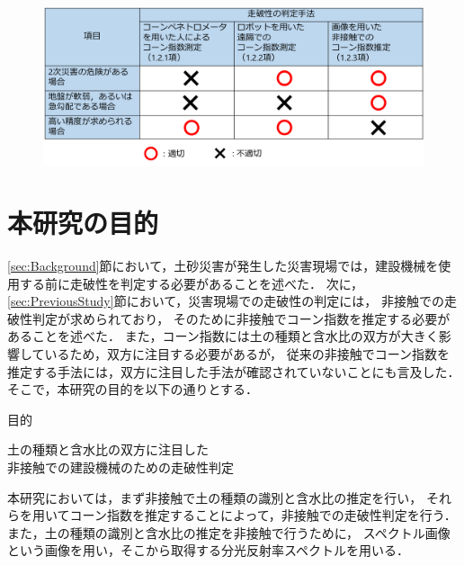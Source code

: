 \begin{figure}[b]
	\begin{center}
	\label{tbl:traditional_and_previous_method}
	\includegraphics[width=13cm]{./Ch1_Introduction/Fig/traditional_and_previous_method_compressed.pdf}
	\vspace{1cm} %
	\end{center}
\end{figure}

\clearpage


\section{本研究の目的}\label{sec:Objective}

\ref{sec:Background}節において，土砂災害が発生した災害現場では，建設機械を使用する前に走破性を判定する必要があることを述べた．
次に，\ref{sec:PreviousStudy}節において，災害現場での走破性の判定には，
非接触での走破性判定が求められており，
そのために非接触でコーン指数を推定する必要があることを述べた．
また，コーン指数には土の種類と含水比の双方が大きく影響しているため，双方に注目する必要があるが，
従来の非接触でコーン指数を推定する手法には，双方に注目した手法が確認されていないことにも言及した．
そこで，本研究の目的を以下の通りとする．

\vspace{5pt}
\begin{itembox}[c]{目的}
\begin{center}
土の種類と含水比の双方に注目した\\非接触での建設機械のための走破性判定
\end{center}
\end{itembox}
\vspace{5pt}

本研究においては，まず非接触で土の種類の識別と含水比の推定を行い，
それらを用いてコーン指数を推定することによって，非接触での走破性判定を行う．
また，土の種類の識別と含水比の推定を非接触で行うために，
スペクトル画像という画像を用い，そこから取得する分光反射率スペクトルを用いる．


